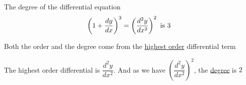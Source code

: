\documentclass[14pt,fleqn]{extarticle}
\begin{document}
 
\begin{snippet}
    
    \incorrect
    
    The degree of the differential equation \[\left(1+\frac{dy}{dx} \right)^3 = \left(\frac{d^2y}{dx^2} \right)^2\text{ is } 3\] 
    \reason
    
    Both the order and the degree come from the \underline{highest order} differential
    term\newline 
    
    The highest order differential is $\dfrac{d^2 y}{dx^2}$. And as we have $\left(\dfrac{d^2 y}{dx^2} \right)^2$, the \underline{degree} is $2$
    
\end{snippet} 
\end{document}
